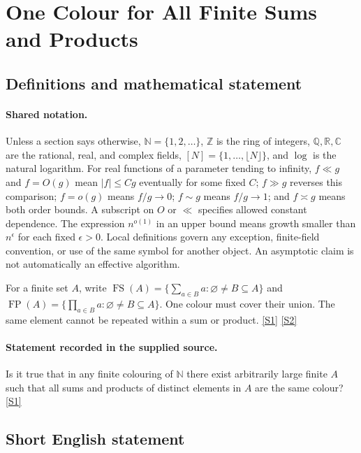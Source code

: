 \documentclass[11pt,a4paper]{article}
\newcommand{\N}{\mathbb{N}}
\newcommand{\Z}{\mathbb{Z}}
\newcommand{\Q}{\mathbb{Q}}
\newcommand{\R}{\mathbb{R}}
\newcommand{\C}{\mathbb{C}}
\newcommand{\sref}[2]{\hyperlink{source:#1:#2}{[S#2]}}
\begin{document}
\section{One Colour for All Finite Sums and Products}\label{statement}


\subsection{Definitions and mathematical statement}

\paragraph{Shared notation.}Unless a section says otherwise, $\N=\{1,2,\ldots\}$,
$\Z$ is the ring of integers, $\Q,\R,\C$ are the rational, real, and complex
fields, $[N]=\{1,\ldots,\lfloor N\rfloor\}$, and $\log$ is the natural
logarithm. For real functions of a parameter tending to infinity,
$f\ll g$ and $f=O(g)$ mean $|f|\leq Cg$ eventually for some fixed $C$;
$f\gg g$ reverses this comparison; $f=o(g)$ means $f/g\to0$;
$f\sim g$ means $f/g\to1$; and $f\asymp g$ means both order bounds.
A subscript on $O$ or $\ll$ specifies allowed constant dependence.
The expression $n^{o(1)}$ in an upper bound means growth smaller than
$n^\epsilon$ for each fixed $\epsilon>0$. Local definitions govern any
exception, finite-field convention, or use of the same symbol for another
object. An asymptotic claim is not automatically an effective algorithm.



For a finite set $A$, write $\operatorname{FS}(A)=\{\sum_{a\in B}a:\varnothing\ne B\subseteq A\}$ and $\operatorname{FP}(A)=\{\prod_{a\in B}a:\varnothing\ne B\subseteq A\}$. One colour must cover their union. The same element cannot be repeated within a sum or product. \sref{statement}{1} \sref{statement}{2}

\paragraph{Statement recorded in the supplied source.}
Is it true that in any finite colouring of $\mathbb{N}$ there exist arbitrarily large finite $A$ such that all sums and products of distinct elements in $A$ are the same colour? \sref{statement}{1}

\subsection{Short English statement}
\end{document}
